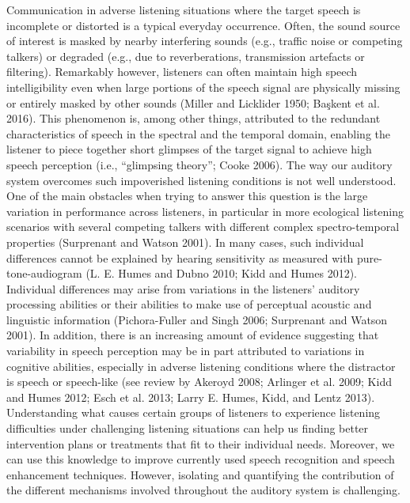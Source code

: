 \documentclass[a4paper,nobind]{templates/ociamthesis}
\begin{document}
Communication in adverse listening situations where the target speech is incomplete or distorted is a typical everyday occurrence. Often, the sound source of interest is masked by nearby interfering sounds (e.g., traffic noise or competing talkers) or degraded (e.g., due to reverberations, transmission artefacts or filtering). Remarkably however, listeners can often maintain high speech intelligibility even when large portions of the speech signal are physically missing or entirely masked by other sounds (Miller and Licklider 1950; Başkent et al. 2016). This phenomenon is, among other things, attributed to the redundant characteristics of speech in the spectral and the temporal domain, enabling the listener to piece together short glimpses of the target signal to achieve high speech perception (i.e., {``glimpsing theory''}; Cooke 2006).
The way our auditory system overcomes such impoverished listening conditions is not well understood.
One of the main obstacles when trying to answer this question is the large variation in performance across listeners, in particular in more ecological listening scenarios with several competing talkers with different complex spectro-temporal properties (Surprenant and Watson 2001).
In many cases, such individual differences cannot be explained by hearing sensitivity as measured with pure-tone-audiogram (L. E. Humes and Dubno 2010; Kidd and Humes 2012).
Individual differences may arise from variations in the listeners' auditory processing abilities or their abilities to make use of perceptual acoustic and linguistic information (Pichora-Fuller and Singh 2006; Surprenant and Watson 2001).
In addition, there is an increasing amount of evidence suggesting that variability in speech perception may be in part attributed to variations in cognitive abilities, especially in adverse listening conditions where the distractor is speech or speech-like (see review by Akeroyd 2008; Arlinger et al. 2009; Kidd and Humes 2012; Esch et al. 2013; Larry E. Humes, Kidd, and Lentz 2013).
Understanding what causes certain groups of listeners to experience listening difficulties under challenging listening situations can help us finding better intervention plans or treatments that fit to their individual needs. Moreover, we can use this knowledge to improve currently used speech recognition and speech enhancement techniques.
However, isolating and quantifying the contribution of the different mechanisms involved throughout the auditory system is challenging.\\
\end{document}
